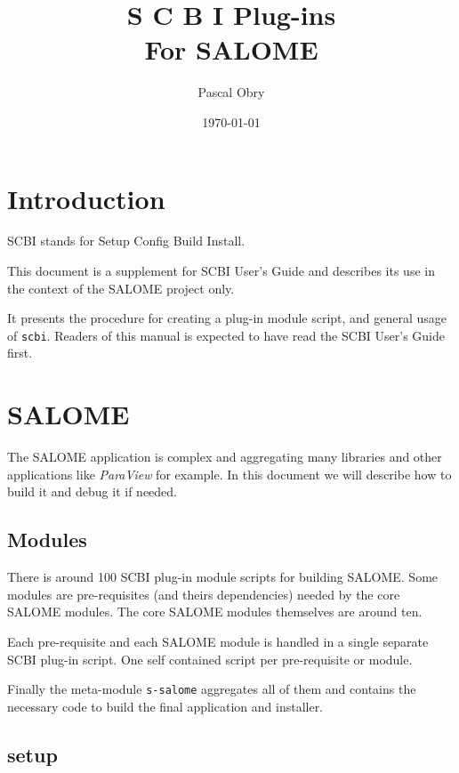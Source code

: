\documentclass[a4paper,12pt,twoside]{article}
\title{\huge{S C B I \hspace{2mm} Plug-ins} \\ For SALOME \version}
\author{Pascal Obry}
\date{\today}
\newcommand{\code}[1]{\texttt{#1}}
\renewcommand{\emph}[1]{\textit{#1}}
\let\stdsection\section
\renewcommand\section{\newpage\stdsection}
\begin{document}
\maketitle

\tableofcontents


\section{Introduction}

SCBI stands for Setup Config Build Install.

This document is a supplement for SCBI User's Guide and describes its use in the context of the SALOME project only.

It presents the procedure for creating a plug-in module script, and general usage of \code{scbi}. Readers of this manual is expected to have read the SCBI User's Guide first.


\section{SALOME}

The SALOME application is complex and aggregating many libraries and other applications like \emph{ParaView} for example. In this document we will describe how to build it and debug it if needed.

\subsection{Modules}
\label{modules}

There is around 100 SCBI plug-in module scripts for building SALOME. Some modules are pre-requisites (and theirs dependencies) needed by the core SALOME modules. The core SALOME modules themselves are around ten.

Each pre-requisite and each SALOME module is handled in a single separate SCBI plug-in script. One self contained script per pre-requisite or module.

Finally the meta-module \code{s-salome} aggregates all of them and contains the necessary code to build the final application and installer.

\subsection{setup}
\end{document}
